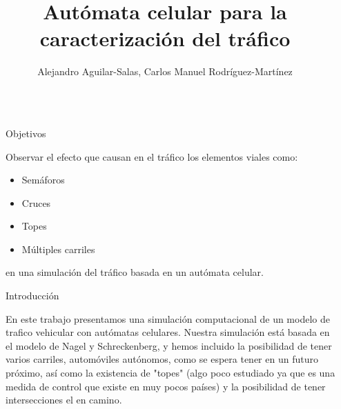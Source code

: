 \documentclass[final]{beamer}
\title{Autómata celular para la caracterización del tráfico} %
\author{Alejandro Aguilar-Salas, Carlos Manuel Rodríguez-Martínez} %
\institute{Departamento de Física, Universidad Veracruzana} %
\newlength{\sepwid}
\newlength{\onecolwid}
\begin{document}

\setlength{\belowcaptionskip}{2ex} %
\setlength\belowdisplayshortskip{2ex} %

\begin{frame}[t] %

\begin{columns}[t] %

\begin{column}{\sepwid}\end{column} %

\begin{column}{\onecolwid} %


\begin{alertblock}{Objetivos}

Observar el efecto que causan en el tráfico los elementos viales como:
\begin{itemize}
\item Semáforos
\item Cruces
\item Topes
\item Múltiples carriles
\end{itemize}
en una simulación del tráfico basada en un autómata celular.

\end{alertblock}


\begin{block}{Introducción}

En este trabajo presentamos una simulación computacional
de un modelo de trafico vehicular con autómatas celulares. Nuestra 
simulación está basada en el modelo de Nagel y Schreckenberg, y 
hemos incluido la posibilidad de tener varios carriles, automóviles autónomos,
como se espera tener en un futuro próximo, así como la existencia
de "topes" (algo poco estudiado ya que es una medida de control que
existe en muy pocos países) y la posibilidad de tener intersecciones
el en camino.


\end{block}
\end{column}
\end{columns}
\end{frame}
\end{document}
